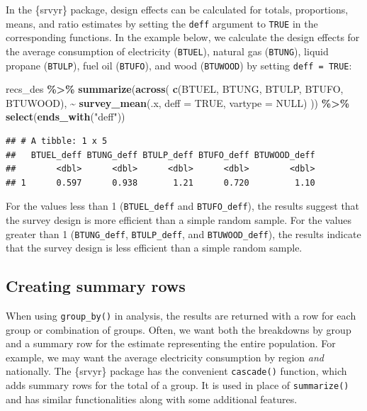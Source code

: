 \documentclass[
]{krantz}
\makeatletter
\newenvironment{Shaded}{\begin{snugshade}}{\end{snugshade}}
\newcommand{\AttributeTok}[1]{\textcolor[rgb]{0.27,0.27,0.27}{#1}}
\newcommand{\ConstantTok}[1]{\textcolor[rgb]{0.37,0.37,0.37}{#1}}
\newcommand{\FunctionTok}[1]{\textcolor[rgb]{0.27,0.27,0.27}{\textbf{#1}}}
\newcommand{\NormalTok}[1]{#1}
\newcommand{\SpecialCharTok}[1]{\textcolor[rgb]{0.43,0.43,0.43}{\textbf{#1}}}
\newcommand{\StringTok}[1]{\textcolor[rgb]{0.5,0.5,0.5}{#1}}
\newenvironment{kframe}{%
\medskip{}
\setlength{\fboxsep}{.8em}
 \def\at@end@of@kframe{}%
 \ifinner\ifhmode%
  \def\at@end@of@kframe{\end{minipage}}%
  \begin{minipage}{\columnwidth}%
 \fi\fi%
 \def\FrameCommand##1{\hskip\@totalleftmargin \hskip-\fboxsep
 \colorbox{shadecolor}{##1}\hskip-\fboxsep
     \hskip-\linewidth \hskip-\@totalleftmargin \hskip\columnwidth}%
 \MakeFramed {\advance\hsize-\width
   \@totalleftmargin\z@ \linewidth\hsize
   \@setminipage}}%
 {\par\unskip\endMakeFramed%
 \at@end@of@kframe}
\renewenvironment{Shaded}{\begin{kframe}}{\end{kframe}}
\makeatother
\begin{document}
In the \{srvyr\} package, design effects can be calculated for totals, proportions, means, and ratio estimates by setting the \texttt{deff} argument to \texttt{TRUE} in the corresponding functions. In the example below, we calculate the design effects for the average consumption of electricity (\texttt{BTUEL}), natural gas (\texttt{BTUNG}), liquid propane (\texttt{BTULP}), fuel oil (\texttt{BTUFO}), and wood (\texttt{BTUWOOD}) by setting \texttt{deff\ =\ TRUE}:

\begin{Shaded}
\begin{Highlighting}[]
\NormalTok{recs\_des }\SpecialCharTok{\%\textgreater{}\%}
  \FunctionTok{summarize}\NormalTok{(}\FunctionTok{across}\NormalTok{(}
    \FunctionTok{c}\NormalTok{(BTUEL, BTUNG, BTULP, BTUFO, BTUWOOD),}
    \SpecialCharTok{\textasciitilde{}} \FunctionTok{survey\_mean}\NormalTok{(.x, }\AttributeTok{deff =} \ConstantTok{TRUE}\NormalTok{, }\AttributeTok{vartype =} \ConstantTok{NULL}\NormalTok{)}
\NormalTok{  )) }\SpecialCharTok{\%\textgreater{}\%}
  \FunctionTok{select}\NormalTok{(}\FunctionTok{ends\_with}\NormalTok{(}\StringTok{"deff"}\NormalTok{))}
\end{Highlighting}
\end{Shaded}

\begin{verbatim}
## # A tibble: 1 x 5
##   BTUEL_deff BTUNG_deff BTULP_deff BTUFO_deff BTUWOOD_deff
##        <dbl>      <dbl>      <dbl>      <dbl>        <dbl>
## 1      0.597      0.938       1.21      0.720         1.10
\end{verbatim}

For the values less than 1 (\texttt{BTUEL\_deff} and \texttt{BTUFO\_deff}), the results suggest that the survey design is more efficient than a simple random sample. For the values greater than 1 (\texttt{BTUNG\_deff}, \texttt{BTULP\_deff}, and \texttt{BTUWOOD\_deff}), the results indicate that the survey design is less efficient than a simple random sample.

\hypertarget{creating-summary-rows}{%
\subsection{Creating summary rows}\label{creating-summary-rows}}

When using \texttt{group\_by()} in analysis, the results are returned with a row for each group or combination of groups. Often, we want both the breakdowns by group and a summary row for the estimate representing the entire population. For example, we may want the average electricity consumption by region \emph{and} nationally. The \{srvyr\} package has the convenient \texttt{cascade()} function, which adds summary rows for the total of a group. It is used in place of \texttt{summarize()} and has similar functionalities along with some additional features.
\end{document}
